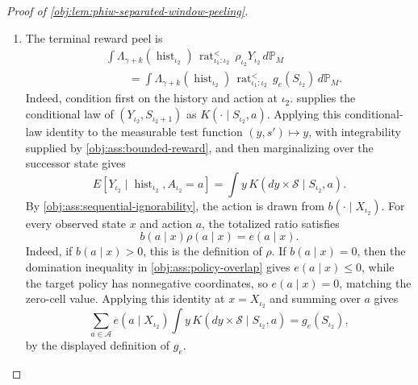 \begin{proof}[Proof of \cref{obj:lem:phiw-separated-window-peeling}]
\begin{enumerate}
\item The terminal reward peel is
\[
\begin{aligned}
&\int
\Lambda_{\gamma+k}(\operatorname{hist}_{\iota_2})\,
\operatorname{rat}^{<}_{\iota_1:\iota_2}\,
\rho_{\iota_2}Y_{\iota_2}\,d\mathbb P_M  \\
&\qquad =
\int
\Lambda_{\gamma+k}(\operatorname{hist}_{\iota_2})\,
\operatorname{rat}^{<}_{\iota_1:\iota_2}\,
g_e(S_{\iota_2})\,d\mathbb P_M .
\end{aligned}
\]
Indeed, condition first on the history and action at \(\iota_2\).  
supplies the conditional law of \((Y_{\iota_2},S_{\iota_2+1})\) as
\(K(\cdot\mid S_{\iota_2},a)\). Applying this conditional-law identity to the measurable test
function \((y,s')\mapsto y\), with integrability supplied by \cref{obj:ass:bounded-reward}, and then
marginalizing over the successor state gives
\[
E[Y_{\iota_2}\mid \operatorname{hist}_{\iota_2},A_{\iota_2}=a]
=
\int y\,K(dy\times\mathcal S\mid S_{\iota_2},a).
\]
By \cref{obj:ass:sequential-ignorability}, the action is drawn from \(b(\cdot\mid X_{\iota_2})\).  For every observed state \(x\) and action \(a\), the totalized ratio satisfies
\[
b(a\mid x)\rho(a\mid x)=e(a\mid x).
\]
Indeed, if \(b(a\mid x)>0\), this is the definition of \(\rho\). If \(b(a\mid x)=0\), then the
domination inequality in \cref{obj:ass:policy-overlap} gives \(e(a\mid x)\le0\), while the target policy has nonnegative coordinates, so
\(e(a\mid x)=0\), matching the zero-cell value. Applying this identity at \(x=X_{\iota_2}\) and
summing over \(a\) gives
\[
\sum_{a\in\mathcal A}e(a\mid X_{\iota_2})
\int y\,K(dy\times\mathcal S\mid S_{\iota_2},a)
=g_e(S_{\iota_2}),
\]
by the displayed definition of \(g_e\).


\end{enumerate}
\end{proof}
